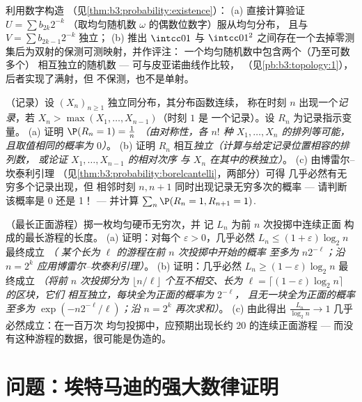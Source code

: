 \begin{exercise}[$\star\star$]\label{exo:b3:probability:10}
利用数字构造
（见\cref{thm:b3:probability:existence}）：
(a) 直接计算验证 $U = \sum b_{2k}2^{-k}$
（取均匀随机数 $\omega$ 的偶数位数字）服从均匀分布，
且与 $V = \sum b_{2k-1}2^{-k}$ 独立；
(b) 推出 $\intcc01$ 与
$\intcc01^2$ 之间存在一个去掉零测集后为双射的保测可测映射，并作评注：
一个均匀随机数中包含两个（乃至可数多个）
相互独立的随机数 --- 可与皮亚诺曲线作比较，
（见\cref{pb:b3:topology:1}），后者实现了满射，但
不保测，也不是单射。
\end{exercise}

\begin{exercise}[$\star\star$]\label{exo:b3:probability:11}
（记录）设 $(X_n)_{n\geq1}$ 独立同分布，其分布函数连续，
称在时刻 $n$ 出现一个\emph{记录}，若
$X_n > \max(X_1, \dots, X_{n-1})$（时刻 $1$ 是
一个记录）。设 $R_n$ 为记录指示变量。
(a) 证明 $\P(R_n = 1) = \frac1n$ \emph{（由对称性，各
$n!$ 种 $X_1, \dots, X_n$ 的排列等可能，
且取值相同的概率为 $0$）}。
(b) 证明 $R_n$ 相互\emph{独立}\emph{（计算与给定记录位置相容的排列数，
或论证
$X_1, \dots, X_{n-1}$ 的相对次序
与 $X_n$ 在其中的秩独立）}。
(c) 由博雷尔–坎泰利引理
（见\cref{thm:b3:probability:borelcantelli}，两部分）可得
几乎必然有无穷多个记录出现，但
相邻时刻 $n, n+1$ 同时出现记录无穷多次的概率
--- 请判断该概率是 0 还是 1！ --- 并计算
$\sum_n\P(R_n = 1, R_{n+1} = 1)$.
\end{exercise}

\begin{exercise}[$\star\star$]\label{exo:b3:probability:12}
（最长正面游程）掷一枚均匀硬币无穷次，并
记 $L_n$ 为前 $n$ 次投掷中连续正面
构成的最长游程的长度。
(a) 证明：对每个 $\varepsilon > 0$，几乎必然 $L_n \leq
(1 + \varepsilon)\log_2n$ 最终成立 \emph{（
某个长为 $\ell$ 的游程在前 $n$ 次投掷中开始的概率
至多为 $n2^{-\ell}$；沿 $n =
2^k$ 应用博雷尔–坎泰利引理）}。
(b) 证明：几乎必然 $L_n \geq (1 - \varepsilon)\log_2n$
最终成立 \emph{（将前 $n$ 次投掷分为
$\lfloor n/\ell\rfloor$ 个互不相交、长为 $\ell =
\lceil(1 - \varepsilon)\log_2n\rceil$ 的区块，它们
相互独立，每块全为正面的概率为 $2^{-\ell}$，
且无一块全为正面的概率至多为
$\exp(-n2^{-\ell}/\ell)$；沿 $n = 2^k$ 再次求和）}。
(c) 由此得出 $\frac{L_n}{\log_2n} \to 1$ 几乎必然成立：在一百万次
均匀投掷中，应预期出现长约 $20$ 的连续正面游程 ---
而没有这种游程的数据，很可能是伪造的。
\end{exercise}

\section{问题：埃特马迪的强大数律证明}

